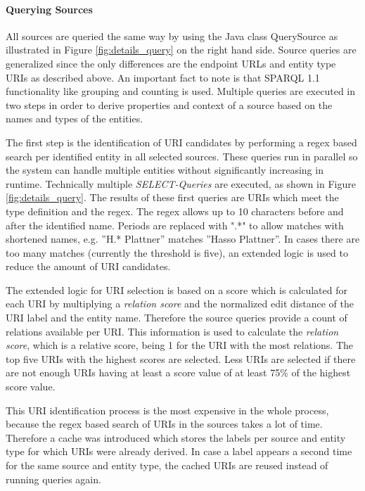 \paragraph{Querying Sources}
All sources are queried the same way by using the Java class QuerySource as illustrated in Figure \ref{fig:details_query} on the right hand side. Source queries are generalized since the only differences are the endpoint URLs and entity type URIs as described above. An important fact to note is that SPARQL 1.1 functionality like grouping and counting is used. Multiple queries are executed in two steps in order to derive properties and context of a source based on the names and types of the entities.

The first step is the identification of URI candidates by performing a regex based search per identified entity in all selected sources. These queries run in parallel so the system can handle multiple entities without significantly increasing in runtime. Technically multiple \textit{SELECT-Queries} are executed, as shown in Figure \ref{fig:details_query}. The results of these first queries are URIs which meet the type definition and the regex. The regex allows up to 10 characters before and after the identified name. Periods are replaced with ".*" to allow matches with shortened names,  e.g. ''H.* Plattner'' matches ''Hasso Plattner''. In cases there are too many matches (currently the threshold is five), an extended logic is used to reduce the amount of URI candidates. 


The extended logic for URI selection is based on a score which is calculated for each URI by multiplying a \textit{relation score} and the normalized edit distance of the URI label and the entity name. Therefore the source queries provide a count of relations available per URI. This information is used to calculate the \textit{relation score}, which is a relative score, being 1 for the URI with the most relations. The top five URIs with the highest scores are selected. Less URIs are selected if there are not enough URIs having at least a score value of at least 75\% of the highest score value.

This URI identification process is the most expensive in the whole process, because the regex based search of URIs in the sources takes a lot of time. Therefore a cache was introduced which stores the labels per source and entity type for which URIs were already derived. In case a label appears a second time for the same source and entity type, the cached URIs are reused instead of running queries again.


